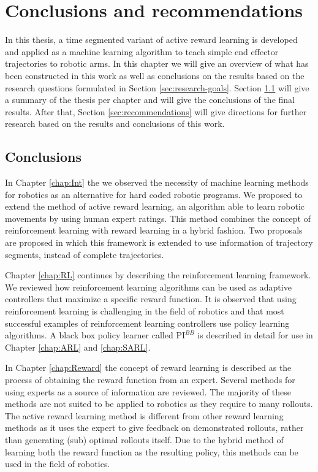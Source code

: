 \documentclass[mscThesis.tex]{subfiles}
\begin{document}
\chapter{Conclusions and recommendations}
In this thesis, a time segmented variant of active reward learning is developed and applied as a machine learning algorithm to teach simple end effector trajectories to robotic arms. In this chapter we will give an overview of what has been constructed in this work as well as conclusions on the results based on the research questions formulated in Section \ref{sec:research-goals}. Section \ref{sec:conclusions} will give a summary of the thesis per chapter and will give the conclusions of the final results. After that, Section \ref{sec:recommendations} will give directions for further research based on the results and conclusions of this work.

\section{Conclusions}
\label{sec:conclusions}

In Chapter \ref{chap:Int} the we observed the necessity of machine learning methods for robotics as an alternative for hard coded robotic programs. We proposed to extend the method of active reward learning, an algorithm able to learn robotic movements by using human expert ratings. This method combines the concept of reinforcement learning with reward learning in a hybrid fashion. Two proposals are proposed in which this framework is extended to use information of trajectory segments, instead of complete trajectories.

Chapter \ref{chap:RL} continues by describing the reinforcement learning framework. We reviewed how reinforcement learning algorithms can be used as adaptive controllers that maximize a specific reward function. It is observed that using reinforcement learning is challenging in the field of robotics and that most successful examples of reinforcement learning controllers use policy learning algorithms. A black box policy learner called $\text{PI}^{BB}$ is described in detail for use in Chapter \ref{chap:ARL} and \ref{chap:SARL}.

In Chapter \ref{chap:Reward} the concept of reward learning is described as the process of obtaining the reward function from an expert. Several methods for using experts as a source of information are reviewed. The majority of these methods are not suited to be applied to robotics as they require to many rollouts. The active reward learning method is different from other reward learning methods as it uses the expert to give feedback on demonstrated rollouts, rather than generating (sub) optimal rollouts itself. Due to the hybrid method of learning both the reward function as the resulting policy, this methods can be used in the field of robotics.
\end{document}
